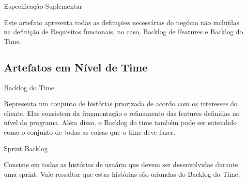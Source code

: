 \begin{itemize}
{
	\large{\item Especificação Suplementar\\}

	\tab Este artefato apresenta todas as definições necessárias do negócio não incluídas na definição de Requisitos funcionais, no caso, Backlog de Features e Backlog do Time. \\
}

{\large{\subsection{Artefatos em Nível de Time }}}

{
	\large{\item Backlog do Time \\}

	\tab Representa um conjunto de histórias priorizada de acordo com os interesses do cliente. Elas consistem da fragmentação e refinamento das features definidas no nível do programa. Além disso, o Backlog do time também pode ser entendido como o conjunto de todas as coisas que o time deve fazer. \\
}

{
	\large{\item Sprint Backlog\\}

	\tab Consiste em todas as histórias de usuário que devem ser desenvolvidas durante uma sprint. Vale ressaltar que estas histórias são oriundas do Backlog do Time. \\
}
\end{itemize}
